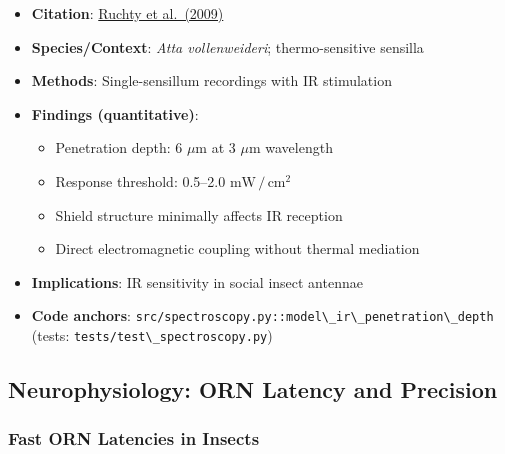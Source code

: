 \documentclass[
  13pt,
  a4paperpaper,
  12pt]{article}
\newcommand{\passthrough}[1]{#1}
\providecommand{\tightlist}{%
  \setlength{\itemsep}{0pt}\setlength{\parskip}{0pt}}
\begin{document}
\begin{itemize}
\tightlist
\item
  \textbf{Citation}:
  \href{https://pubmed.ncbi.nlm.nih.gov/19095080/}{Ruchty et al.~(2009)}
\item
  \textbf{Species/Context}: \emph{Atta vollenweideri}; thermo-sensitive
  sensilla
\item
  \textbf{Methods}: Single-sensillum recordings with IR stimulation
\item
  \textbf{Findings (quantitative)}:

  \begin{itemize}
  \tightlist
  \item
    Penetration depth: 6 \(\mu\mathrm{m}\) at 3 \(\mu\mathrm{m}\)
    wavelength
  \item
    Response threshold: 0.5--2.0 \(\mathrm{mW}\,/\,\mathrm{cm}^2\)
  \item
    Shield structure minimally affects IR reception
  \item
    Direct electromagnetic coupling without thermal mediation
  \end{itemize}
\item
  \textbf{Implications}: IR sensitivity in social insect antennae
\item
  \textbf{Code anchors}:
  \passthrough{\lstinline!src/spectroscopy.py::model\_ir\_penetration\_depth!}
  (tests: \passthrough{\lstinline!tests/test\_spectroscopy.py!})
\end{itemize}

\subsection{Neurophysiology: ORN Latency and
Precision}\label{neurophysiology-orn-latency-and-precision}

\subsubsection{Fast ORN Latencies in
Insects}\label{fast-orn-latencies-in-insects}
\end{document}
